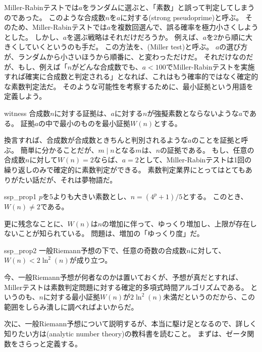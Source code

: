 Miller-Rabinテストでは$a$をランダムに選ぶと、「素数」と誤って判定してしまうのであった。
このような合成数$n$を$a$に対する(strong pseudoprime)と呼ぶ。
そのため、Miller-Rabinテストでは$a$を複数回選んで、誤る確率を極力小さくしようとした。
しかし、$a$を選ぶ戦略はそれだけだろうか。
例えば、$a$を$2$から順に大きくしていくというのも手だ。
この方法を、(Miller test)と呼ぶ。
$a$の選び方が、ランダムから小さいほうから順番に、と変わっただけだ。
それだけなのだが、もし、例えば「$n$がどんな合成数でも、$a<100$でMiller-Rabinテストを実施すれば確実に合成数と判定される」となれば、これはもう確率的ではなく確定的な素数判定法だ。
そのような可能性を考察するために、最小証拠という用語を定義しよう。

\begin{Defi}{}{witness}
合成数$n$に対する証拠は、$a$に対する$n$が強擬素数とならないような$a$である。
証拠$a$の中で最小のものを最小証拠$W(n)$とする。
\end{Defi}

換言すれば、合成数が合成数ときちんと判別されるような$a$のことを証拠と呼ぶ。
簡単に分かることだが、$m \mid n$となる$m$は、$n$の証拠である。
もし、任意の合成数$n$に対して$W(n)=2$ならば、$a=2$として、Miller-Rabinテストは1回の繰り返しのみで確定的に素数判定ができる。
素数判定業界にとってはとてもありがたい話だが、それは夢物語だ。

\begin{Theo}{}{ssp_prop1}
$p$を5よりも大きい素数とし、$n=(4^p+1)/5$とする。
このとき、$W(n)\neq2$である。
\end{Theo}

更に残念なことに、$W(n)$は$n$の増加に伴って、ゆっくり増加し、上限が存在しないことが知られている。
問題は、増加の「ゆっくり度」だ。

\begin{Theo}{}{ssp_prop2}
一般Riemann予想の下で、任意の奇数の合成数$n$に対して、$W(n)<2\ln^2(n)$が成り立つ。
\end{Theo}

今、一般Riemann予想が何者なのかは置いておくが、予想が真だとすれば、Millerテストは素数判定問題に対する確定的多項式時間アルゴリズムである。
というのも、$n$に対する最小証拠$W(n)$が$2\ln^2(n)$未満だというのだから、この範囲をしらみ潰しに調べればよいからだ。

次に、一般Riemann予想について説明するが、本当に駆け足となるので、詳しく知りたい方は(analytic number theory)の教科書を読むこと。
まずは、ゼータ関数をさらっと定義する。

